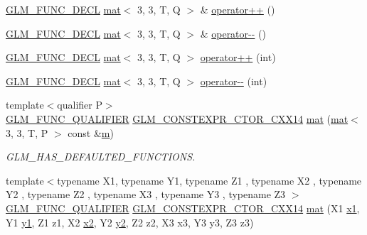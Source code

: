 \begin{DoxyCompactItemize}
\item 
\hyperlink{setup_8hpp_ab2d052de21a70539923e9bcbf6e83a51}{G\+L\+M\+\_\+\+F\+U\+N\+C\+\_\+\+D\+E\+CL} \hyperlink{structglm_1_1mat}{mat}$<$ 3, 3, T, Q $>$ \& \hyperlink{structglm_1_1mat_3_013_00_013_00_01_t_00_01_q_01_4_ab04f2425cf74fb2edd7fdef18e9c2201}{operator++} ()
\item 
\hyperlink{setup_8hpp_ab2d052de21a70539923e9bcbf6e83a51}{G\+L\+M\+\_\+\+F\+U\+N\+C\+\_\+\+D\+E\+CL} \hyperlink{structglm_1_1mat}{mat}$<$ 3, 3, T, Q $>$ \& \hyperlink{structglm_1_1mat_3_013_00_013_00_01_t_00_01_q_01_4_ae00b3ec3496cd413781d7169997f666f}{operator-\/-\/} ()
\item 
\hyperlink{setup_8hpp_ab2d052de21a70539923e9bcbf6e83a51}{G\+L\+M\+\_\+\+F\+U\+N\+C\+\_\+\+D\+E\+CL} \hyperlink{structglm_1_1mat}{mat}$<$ 3, 3, T, Q $>$ \hyperlink{structglm_1_1mat_3_013_00_013_00_01_t_00_01_q_01_4_a1c09b6fe99f20acf55ee20c1820ff0cd}{operator++} (int)
\item 
\hyperlink{setup_8hpp_ab2d052de21a70539923e9bcbf6e83a51}{G\+L\+M\+\_\+\+F\+U\+N\+C\+\_\+\+D\+E\+CL} \hyperlink{structglm_1_1mat}{mat}$<$ 3, 3, T, Q $>$ \hyperlink{structglm_1_1mat_3_013_00_013_00_01_t_00_01_q_01_4_a7d3a048df9c2f4e1ba2495b60655db4b}{operator-\/-\/} (int)
\item 
{\footnotesize template$<$qualifier P$>$ }\\\hyperlink{setup_8hpp_a33fdea6f91c5f834105f7415e2a64407}{G\+L\+M\+\_\+\+F\+U\+N\+C\+\_\+\+Q\+U\+A\+L\+I\+F\+I\+ER} \hyperlink{setup_8hpp_a0900f9145e68bf6061b6f5e7be3fa751}{G\+L\+M\+\_\+\+C\+O\+N\+S\+T\+E\+X\+P\+R\+\_\+\+C\+T\+O\+R\+\_\+\+C\+X\+X14} \hyperlink{structglm_1_1mat_3_013_00_013_00_01_t_00_01_q_01_4_a58f5f32696916511bd3c65a06ddded18}{mat} (\hyperlink{structglm_1_1mat}{mat}$<$ 3, 3, T, P $>$ const \&\hyperlink{_s_d_l__opengl__glext_8h_af593500c283bf1a787a6f947f503a5c2}{m})
\begin{DoxyCompactList}\small\item\em G\+L\+M\+\_\+\+H\+A\+S\+\_\+\+D\+E\+F\+A\+U\+L\+T\+E\+D\+\_\+\+F\+U\+N\+C\+T\+I\+O\+NS. \end{DoxyCompactList}\item 
{\footnotesize template$<$typename X1, typename Y1, typename Z1 , typename X2 , typename Y2 , typename Z2 , typename X3 , typename Y3 , typename Z3 $>$ }\\\hyperlink{setup_8hpp_a33fdea6f91c5f834105f7415e2a64407}{G\+L\+M\+\_\+\+F\+U\+N\+C\+\_\+\+Q\+U\+A\+L\+I\+F\+I\+ER} \hyperlink{setup_8hpp_a0900f9145e68bf6061b6f5e7be3fa751}{G\+L\+M\+\_\+\+C\+O\+N\+S\+T\+E\+X\+P\+R\+\_\+\+C\+T\+O\+R\+\_\+\+C\+X\+X14} \hyperlink{structglm_1_1mat_3_013_00_013_00_01_t_00_01_q_01_4_a16e5dfdbeabd922f89d0b7ac9a6a07cc}{mat} (X1 \hyperlink{_s_d_l__opengl__glext_8h_a49825216c96caaeb09237b36651181c5}{x1}, Y1 \hyperlink{_s_d_l__opengl__glext_8h_a3af6c78fcdfccea028a5878bc747ef39}{y1}, Z1 z1, X2 \hyperlink{_s_d_l__opengl__glext_8h_a7b907a03236685c534d89d604cff23c8}{x2}, Y2 \hyperlink{_s_d_l__opengl__glext_8h_a2be1135ed68e8d80fa9e130c7814f8c2}{y2}, Z2 z2, X3 x3, Y3 y3, Z3 z3)

\end{DoxyCompactItemize}
